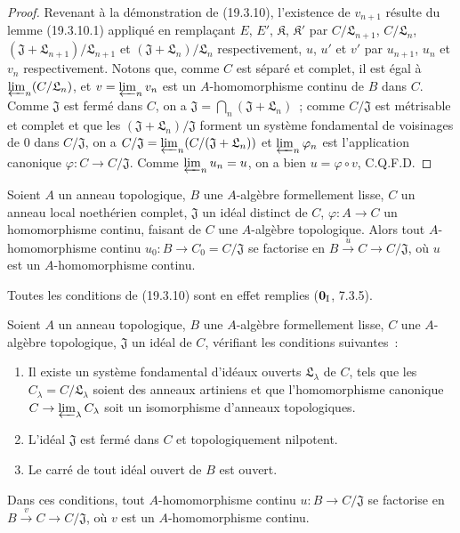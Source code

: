 \begin{proof}
Revenant à la démonstration de (19.3.10), l'existence de $v_{n+1}$ résulte du lemme (19.3.10.1) appliqué en remplaçant
$E$, $E'$, $\mathfrak K$, $\mathfrak K'$ par
$C/\mathfrak L_{n+1}$, $C/\mathfrak L_n$,
$(\mathfrak J+\mathfrak L_{n+1})/\mathfrak L_{n+1}$ et
$(\mathfrak J+\mathfrak L_n)/\mathfrak L_n$ respectivement, $u$, $u'$
et $v'$ par $u_{n+1}$, $u_n$ et $v_n$ respectivement. Notons que, comme $C$
est séparé et complet, il est égal à $\varprojlim_n(C/\mathfrak L_n)$, et
$v=\varprojlim_n v_n$ est un $A$-homomorphisme continu de $B$ dans $C$.
Comme $\mathfrak J$ est fermé dans $C$, on a
$\mathfrak J=\bigcap_n(\mathfrak J+\mathfrak L_n)$~; comme
$C/\mathfrak J$ est métrisable et complet et que les
$(\mathfrak J+\mathfrak L_n)/\mathfrak J$ forment un système fondamental
de voisinages de $0$ dans $C/\mathfrak J$, on a
$C/\mathfrak J=\varprojlim_n(C/(\mathfrak J+\mathfrak L_n))$
et $\varprojlim_n\varphi_n$ est l'application canonique
$\varphi:C\to C/\mathfrak J$. Comme $\varprojlim_n u_n=u$, on a bien
$u=\varphi\circ v$, C.Q.F.D.
\end{proof}

\begin{corollary}[19.3.11]
\label{0.19.3.11-fr}
Soient $A$ un anneau topologique, $B$ une $A$-algèbre formellement lisse,
$C$ un anneau local noethérien complet, $\mathfrak J$ un idéal distinct de
$C$, $\varphi:A\to C$ un homomorphisme continu, faisant de $C$ une
$A$-algèbre topologique. Alors tout $A$-homomorphisme continu
$u_0:B\to C_0=C/\mathfrak J$ se factorise en
$B\xrightarrow{u}C\to C/\mathfrak J$, où $u$ est un $A$-homomorphisme
continu.
\end{corollary}

Toutes les conditions de (19.3.10) sont en effet remplies
($\mathbf 0_{\rm I}$, 7.3.5).

\begin{proposition}[19.3.12]
\label{0.19.3.12-fr}
Soient $A$ un anneau topologique, $B$ une $A$-algèbre formellement lisse,
$C$ une $A$-algèbre topologique, $\mathfrak J$ un idéal de $C$, vérifiant les
conditions suivantes~:
\begin{enumerate}
  \item[$1^\circ$] Il existe un système fondamental d'idéaux ouverts
  $\mathfrak L_\lambda$ de $C$, tels que les
  $C_\lambda=C/\mathfrak L_\lambda$ soient des anneaux artiniens et que
  l'homomorphisme canonique $C\to\varprojlim_\lambda C_\lambda$ soit un
  isomorphisme d'anneaux topologiques.
  \item[$2^\circ$] L'idéal $\mathfrak J$ est fermé dans $C$ et
  topologiquement nilpotent.
  \item[$3^\circ$] Le carré de tout idéal ouvert de $B$ est ouvert.
\end{enumerate}

Dans ces conditions, tout $A$-homomorphisme continu
$u:B\to C/\mathfrak J$ se factorise en
$B\xrightarrow{v}C\to C/\mathfrak J$, où $v$ est un $A$-homomorphisme
continu.
\end{proposition}

